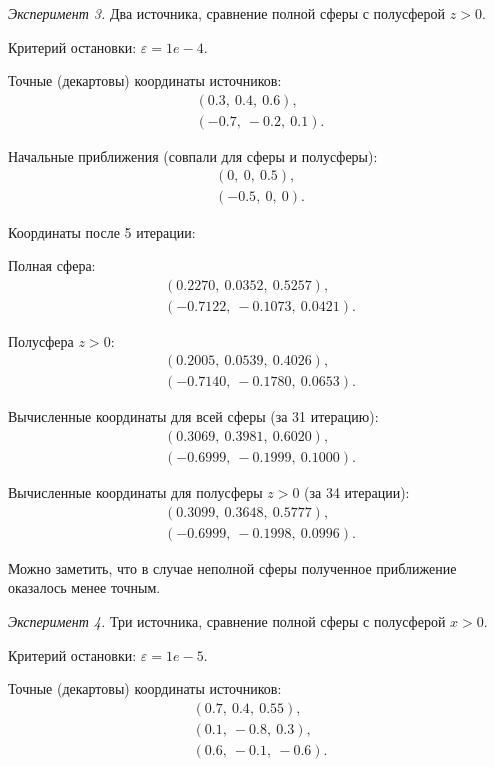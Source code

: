 \emph{Эксперимент 3.} Два источника, сравнение полной сферы с полусферой $z > 0$.

Критерий остановки: $\varepsilon = 1e-4$.

Точные (декартовы) координаты источников:
\begin{align}
    (0.3,\ 0.4,\ 0.6) \text{,}\nonumber\\
    (-0.7,\ -0.2,\ 0.1) \text{.}\nonumber
\end{align}

Начальные приближения (совпали для сферы и полусферы):
\begin{align}
    (0,\ 0,\ 0.5) \text{,}\nonumber\\
    (-0.5,\ 0,\ 0) \text{.}\nonumber
\end{align}

Координаты после 5 итерации:

Полная сфера:
\begin{align}
    (0.2270,\ 0.0352,\ 0.5257) \text{,}\nonumber\\
    (-0.7122,\ -0.1073,\ 0.0421) \text{.}\nonumber
\end{align}

Полусфера $z > 0$:
\begin{align}
    (0.2005,\ 0.0539,\ 0.4026) \text{,}\nonumber\\
    (-0.7140,\ -0.1780,\ 0.0653) \text{.}\nonumber
\end{align}

Вычисленные координаты для всей сферы (за 31 итерацию):
\begin{align}
    (0.3069,\ 0.3981,\ 0.6020) \text{,}\nonumber\\
    (-0.6999,\ -0.1999,\ 0.1000) \text{.}\nonumber
\end{align}

Вычисленные координаты для полусферы $z > 0$ (за 34 итерации):
\begin{align}
    (0.3099,\ 0.3648,\ 0.5777) \text{,}\nonumber\\
    (-0.6999,\ -0.1998,\ 0.0996) \text{.}\nonumber
\end{align}

Можно заметить, что в случае неполной сферы полученное приближение оказалось менее точным.

\emph{Эксперимент 4.} Три источника, сравнение полной сферы с полусферой $x > 0$.

Критерий остановки: $\varepsilon = 1e-5$.

Точные (декартовы) координаты источников:
\begin{align}
    (0.7,\ 0.4,\ 0.55) \text{,}\nonumber\\
    (0.1,\ -0.8,\ 0.3) \text{,}\nonumber\\
    (0.6,\ -0.1,\ -0.6) \text{.}\nonumber
\end{align}

